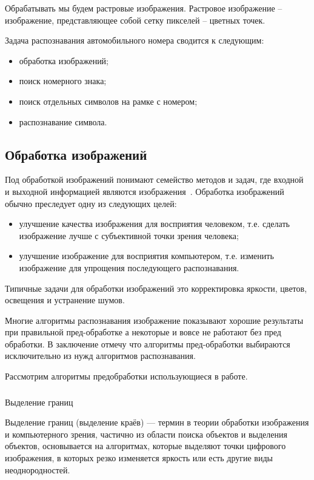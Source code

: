 Обрабатывать мы будем растровые изображения. Растровое изображение -- изображение, представляющее собой сетку пикселей -- цветных точек.

Задача распознавания автомобильного номера сводится к следующим: 
\begin{itemize}
  \item обработка изображений;
  \item поиск номерного знака;
  \item поиск отдельных символов на рамке с номером;
  \item распознавание символа.
\end{itemize}

\subsection{Обработка изображений}
\label{sub:domain:image_processing}

Под обработкой  изображений понимают семейство  методов  и  задач,  где  входной  и  выходной информацией  являются  изображения~\cite{misoi_clides}. Обработка изображений обычно преследует одну из следующих целей:
\begin{itemize}
  \item улучшение качества изображения для восприятия человеком, т.е. сделать изображение лучше с субъективной точки зрения человека;
  \item улучшение изображение для восприятия компьютером, т.е. изменить изображение для упрощения последующего распознавания.
\end{itemize}
Типичные задачи для обработки изображений это корректировка яркости, цветов, освещения и устранение шумов. 

Многие алгоритмы распознавания изображение показывают хорошие результаты при правильной пред-обработке а некоторые и вовсе не работают без пред обработки. В заключение отмечу что алгоритмы пред-обработки выбираются исключительно из нужд алгоритмов распознавания.

Рассмотрим алгоритмы предобработки использующиеся в работе.

\subsubsection{}
\label{sub:domain:image_processing:edges_detection}
Выделение границ

Выделение границ (выделение краёв) — термин в теории обработки изображения и компьютерного зрения, частично из области поиска объектов и выделения объектов, основывается на алгоритмах, которые выделяют точки цифрового изображения, в которых резко изменяется яркость или есть другие виды неоднородностей.


